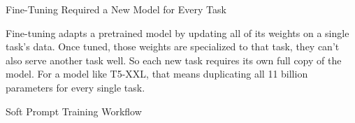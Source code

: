 \documentclass[aspectratio=169,10pt]{beamer}
\begin{document}
\begin{frame}{Fine-Tuning Required a New Model for Every Task}
  \vskip0.1cm
  \centering
  \ptfullfinetune
  \vskip0.9cm
  \begin{minipage}{0.85\textwidth}
    \centering\footnotesize\color{ptink}
    Fine-tuning adapts a pretrained model by updating all of its weights on a
    single task's data. Once tuned, those weights are specialized to that task, they can't also serve another task well. So each new task requires its
    own full copy of the model. For a model like T5-XXL, that means
    duplicating all 11 billion parameters for every single task.
  \end{minipage}
\end{frame}




\begin{frame}{Soft Prompt Training Workflow}
  \vfill
  \centering
  \pttrainloop
  \vfill
\end{frame}
\end{document}
